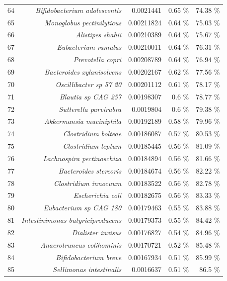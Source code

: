 \documentclass{article}
\begin{document}
\begin{table}
\begin{tabular}{|r|r|r|r|r|}
      64 & \textit{Bifidobacterium adolescentis} & 0.0021441 & 0.65 \% & 74.38 \% \\
      65 & \textit{Monoglobus pectinilyticus} & 0.00211824 & 0.64 \% & 75.03 \% \\
      66 & \textit{Alistipes shahii} & 0.00210389 & 0.64 \% & 75.67 \% \\
      67 & \textit{Eubacterium ramulus} & 0.00210011 & 0.64 \% & 76.31 \% \\
      68 & \textit{Prevotella copri} & 0.00208789 & 0.64 \% & 76.94 \% \\
      69 & \textit{Bacteroides xylanisolvens} & 0.00202167 & 0.62 \% & 77.56 \% \\
      70 & \textit{Oscillibacter sp 57 20} & 0.00201112 & 0.61 \% & 78.17 \% \\
      71 & \textit{Blautia sp CAG 257} & 0.00198307 & 0.6 \% & 78.77 \% \\
      72 & \textit{Sutterella parvirubra} & 0.0019804 & 0.6 \% & 79.38 \% \\
      73 & \textit{Akkermansia muciniphila} & 0.00192189 & 0.58 \% & 79.96 \% \\
      74 & \textit{Clostridium bolteae} & 0.00186087 & 0.57 \% & 80.53 \% \\
      75 & \textit{Clostridium leptum} & 0.00185445 & 0.56 \% & 81.09 \% \\
      76 & \textit{Lachnospira pectinoschiza} & 0.00184894 & 0.56 \% & 81.66 \% \\
      77 & \textit{Bacteroides stercoris} & 0.00184674 & 0.56 \% & 82.22 \% \\
      78 & \textit{Clostridium innocuum} & 0.00183522 & 0.56 \% & 82.78 \% \\
      79 & \textit{Escherichia coli} & 0.00182675 & 0.56 \% & 83.33 \% \\
      80 & \textit{Eubacterium sp CAG 180} & 0.00179463 & 0.55 \% & 83.88 \% \\
      81 & \textit{Intestinimonas butyriciproducens} & 0.00179373 & 0.55 \% & 84.42 \% \\
      82 & \textit{Dialister invisus} & 0.00176827 & 0.54 \% & 84.96 \% \\
      83 & \textit{Anaerotruncus colihominis} & 0.00170721 & 0.52 \% & 85.48 \% \\
      84 & \textit{Bifidobacterium breve} & 0.00167934 & 0.51 \% & 85.99 \% \\
      85 & \textit{Sellimonas intestinalis} & 0.0016637 & 0.51 \% & 86.5 \% \\

\end{tabular}
\end{table}
\end{document}
